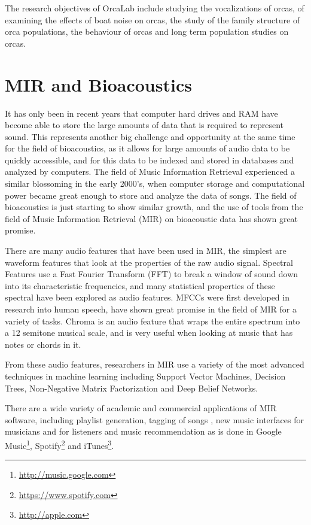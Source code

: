 \documentclass[12pt,oneside]{book}
\begin{document}
The research objectives of OrcaLab include studying the vocalizations
of orcas, of examining the effects of boat noise on orcas, the study
of the family structure of orca populations, the behaviour of orcas
and long term population studies on orcas.  


%
%
\section{MIR and Bioacoustics}
\label{section:introduction:MIRandBioacoustics}

It has only been in recent years that computer hard drives and RAM
have become able to store the large amounts of data that is required
to represent sound.  This represents another big challenge and
opportunity at the same time for the field of bioacoustics, as it
allows for large amounts of audio data to be quickly accessible, and
for this data to be indexed and stored in databases and analyzed by
computers.  The field of Music Information Retrieval experienced a
similar blossoming in the early 2000's, when computer storage and
computational power became great enough to store and analyze the data
of songs.  The field of bioacoustics is just starting to show similar
growth, and the use of tools from the field of Music Information
Retrieval (MIR) on bioacoustic data has shown great promise.

There are many audio features that have been used in MIR, the simplest
are waveform features that look at the properties of the raw audio
signal.  Spectral Features use a Fast Fourier Transform (FFT) to break
a window of sound down into its characteristic frequencies, and many
statistical properties of these spectral have been explored as audio
features.  MFCCs were first developed in research into human speech,
have shown great promise in the field of MIR for a variety of tasks.
Chroma is an audio feature that wraps the entire spectrum into a 12
semitone musical scale, and is very useful when looking at music that
has notes or chords in it.

From these audio features, researchers in MIR use a variety of the
most advanced techniques in machine learning including Support Vector
Machines, Decision Trees, Non-Negative Matrix Factorization and Deep
Belief Networks.

There are a wide variety of academic and commercial applications of
MIR software, including playlist generation, tagging of songs
\cite{ness2009improving}, new music interfaces for musicians
\cite{ness2011gesture} and for listeners \cite{ness2009audioscapes}
and music recommendation \cite{miller2010geoshuffle} as is done in
Google Music\footnote{\url{http://music.google.com}},
Spotify\footnote{\url{https://www.spotify.com}} and
iTunes\footnote{\url{http://apple.com}}.
\end{document}
